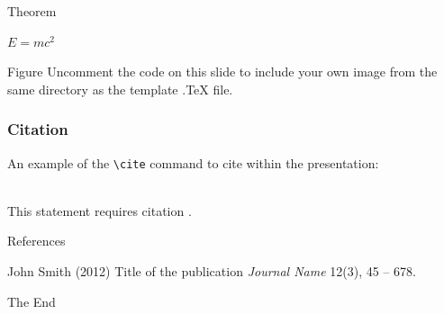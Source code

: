 \documentclass[12pt]{beamer}
\begin{document}

\begin{frame}{Theorem}
    \begin{theorem}
        $E = mc^2$
    \end{theorem}
\end{frame}


\begin{frame}{Figure}
    Uncomment the code on this slide to include your own image from the same directory as the template .TeX file.
\end{frame}


\begin{frame}[fragile] %
    \frametitle{Citation}
    An example of the \verb|\cite| command to cite within the presentation:\\~

    This statement requires citation \cite{p1}.
\end{frame}


\begin{frame}{References}
    \footnotesize{
        \begin{thebibliography}{99}
             John Smith (2012)
            \newblock Title of the publication
            \newblock \emph{Journal Name} 12(3), 45 -- 678.
        \end{thebibliography}
    }
\end{frame}


\begin{frame}
    \Huge{\centerline{The End}}
\end{frame}

\end{document}
